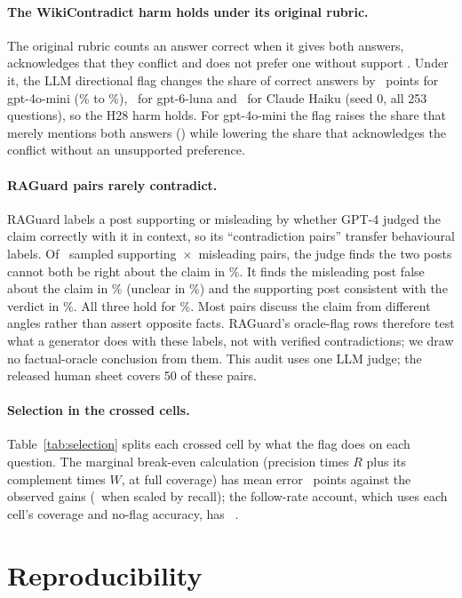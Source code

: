 \paragraph{The WikiContradict harm holds under its original rubric.} The original rubric counts an answer correct when it gives
both answers, acknowledges that they conflict and does not prefer one without support
\citep[\S3.4]{hou2024wikicontradict}. Under it, the LLM directional flag changes the share of correct answers
by \wikiOrigMiniEff\ points for gpt-4o-mini (\wikiOrigMiniPlain\% to \wikiOrigMiniDir\%), \wikiOrigLunaEff\ for
gpt-6-luna and \wikiOrigHaikuEff\ for Claude Haiku (seed 0, all 253 questions), so the H28 harm holds. For gpt-4o-mini the flag raises the share that merely mentions both answers (\wikiBothMiniEff) while
lowering the share that acknowledges the conflict without an unsupported preference.

\paragraph{RAGuard pairs rarely contradict.} RAGuard labels a post supporting or misleading by whether GPT-4 judged the claim correctly
with it in context, so its ``contradiction pairs'' transfer behavioural labels. Of \rgAudN\ sampled
supporting~$\times$~misleading pairs, the judge finds the two posts cannot both be right about the claim in
\rgAudContradict\%. It finds the misleading post false about the claim in \rgAudBFalse\% (unclear in
\rgAudBUnclear\%) and the supporting post consistent with the verdict in \rgAudASupports\%. All three hold for
\rgAudVerified\%. Most pairs discuss the claim from different angles rather than assert opposite
facts. RAGuard's oracle-flag rows therefore test what a generator does with these labels, not with verified
contradictions; we draw no factual-oracle conclusion from them. This audit uses one LLM judge; the released
human sheet covers 50 of these pairs.


\paragraph{Selection in the crossed cells.} Table~\ref{tab:selection} splits each crossed cell by what the flag does
on each question. The marginal break-even calculation (precision times $R$ plus its complement times $W$, at full
coverage) has mean error \selMargMae\ points against the observed gains (\selMargCovMae\ when scaled by recall); the
follow-rate account, which uses each cell's coverage and no-flag accuracy, has \predEightMae\ \predEightMaeCI.

\section{Reproducibility}
\label{app:repro}